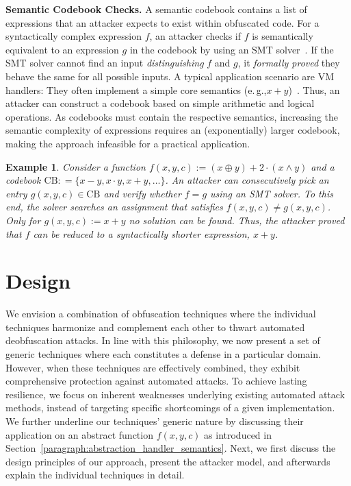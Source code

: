 \documentclass[letterpaper,twocolumn,10pt]{article}
\newcommand{\eg}{e.\,g.,\xspace}
\theoremstyle{customexample}
\newtheorem{example}{Example}
\theoremstyle{customexperiment}
\begin{document}
\textbf{Semantic Codebook Checks.}
A semantic codebook contains a list of expressions that an attacker expects to exist within obfuscated code. For a syntactically complex expression $f$, an attacker checks if $f$ is semantically equivalent to an expression $g$ in the codebook by using an SMT solver~\cite{vanegue2012smt}. If the SMT solver cannot find an input \emph{distinguishing} $f$ and $g$, it \emph{formally proved} they behave the same for all possible inputs.
A typical application scenario are VM handlers: They often implement a simple core semantics (\eg $x + y$)~\cite{rolles2009unpacking,blazytko2017syntia}. Thus, an attacker can construct a codebook based on simple arithmetic and logical operations. 
As codebooks must contain the respective semantics, increasing the semantic complexity of expressions requires an (exponentially) larger codebook, making the approach infeasible for a practical application.
\begin{example}
Consider a function  $f(x, y, c) := (x \oplus y) + 2 \cdot (x \land y)$ and a codebook $\mathrm{CB}: =\{x - y, x \cdot y, x + y, \dots\}$. An attacker can consecutively pick an entry $g(x,y, c)\in \mathrm{CB}$ and verify whether $f = g$ using an SMT solver. To this end, the solver searches an assignment that satisfies $f(x, y, c) \neq g(x,y, c)$. Only for $g(x,y, c) := x + y$ no solution can be found. Thus, the attacker proved that $f$ can be reduced to a syntactically shorter expression, $x + y$.
\end{example}



























 \section{Design}\label{sec:design}

We envision a combination of obfuscation techniques where the individual techniques harmonize and complement each other to thwart automated deobfuscation attacks. 
In line with this philosophy, we now present a set of generic techniques where each constitutes a defense in a particular domain. However, when these techniques are effectively combined, they exhibit comprehensive protection against automated attacks. To achieve lasting resilience, we focus on inherent weaknesses underlying existing automated attack methods, instead of targeting specific shortcomings of a given implementation. We further underline our techniques' generic nature by discussing their application on an abstract function $f(x, y, c)$ as introduced in Section~\ref{paragraph:abstraction_handler_semantics}.
Next, we first discuss the design principles of our approach, present the attacker model, and afterwards explain the individual techniques in detail.
\end{document}
